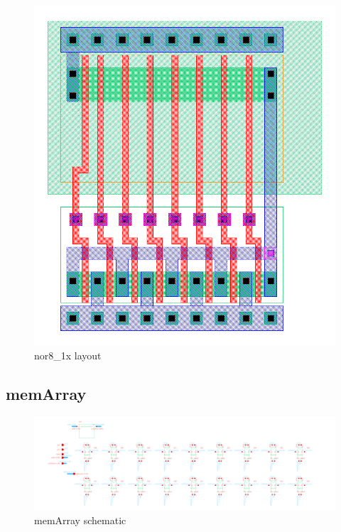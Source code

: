\documentclass[]{article}
\begin{document}
\begin{figure}[H]
\centering
\includegraphics[width=.9\textwidth]{nor8_1x-layout}
\caption{nor8\_1x layout}
\label{fig:nor8-layout}
\end{figure}

\subsection{memArray}
\begin{figure}[H]
\centering
\includegraphics[width=.9\textwidth]{memArray-schematic}
\caption{memArray schematic}
\label{fig:memArray-schematic}
\end{figure}
\end{document}

